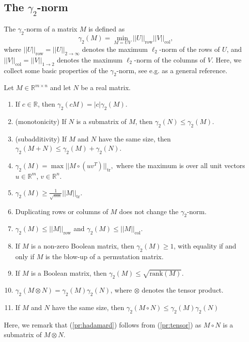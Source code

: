 \documentclass[11pt]{amsart}
\theoremstyle{plain}
\theoremstyle{definition}
\DeclareMathOperator{\tr}{tr}
\DeclareMathOperator{\row}{row}
\DeclareMathOperator{\col}{col}
\begin{document}
\subsection{The $\gamma_2$-norm}\label{sec:gamma2-properties}
The $\gamma_2$-norm of a matrix $M$ is defined as 
$$\gamma_2(M)=\min_{M=UV}||U||_{\row}||V||_{\col},$$
where $||U||_{\row}=||U||_{2\rightarrow\infty}$ denotes the maximum $\ell_2$-norm of the rows of $U$, and $||V||_{\col}=||V||_{1\rightarrow 2}$ denotes the maximum $\ell_2$-norm of the columns of $V$. 
Here, we collect some basic properties of the $\gamma_2$-norm, see e.g. \cite{LSS} as a general reference.

Let $M\in \mathbb{R}^{m\times n}$ and let $N$ be a real matrix.
\begin{enumerate}
    \item If $c\in \mathbb{R}$, then $\gamma_2(cM)=|c|\gamma_2(M)$.
    \item (monotonicity) If $N$ is a submatrix of $M$, then $\gamma_2(N)\leq \gamma_2(M)$.
    \item (subadditivity) If $M$ and $N$ have the same size, then $\gamma_2(M+N)\leq \gamma_2(M)+\gamma_2(N)$.
    \item\label{pr:gamma}  $\gamma_2(M)=\max||M\circ (u v^T)||_{\tr},$ where the maximum is over all unit vectors $u\in \mathbb{R}^m$, $v\in \mathbb{R}^{n}$.
    \item  $\gamma_2(M)\geq \frac{1}{\sqrt{mn}}||M||_{\tr}.$
    \item Duplicating rows or columns of $M$ does not change the $\gamma_2$-norm.
    \item $\gamma_2(M)\leq ||M||_{\row}$ and $\gamma_2(M)\leq ||M||_{\col}$.
    \item If $M$ is a non-zero Boolean matrix, then $\gamma_2(M)\geq 1$, with equality if and only if $M$ is the blow-up of a permutation matrix.
    \item If $M$ is a Boolean matrix, then $\gamma_2(M)\leq \sqrt{\mbox{rank}(M)}$.
    \item\label{pr:tensor} $\gamma_2(M\otimes N)=\gamma_2(M)\gamma_2(N)$, where $\otimes$ denotes the tensor product.
    \item\label{pr:hadamard} If $M$ and $N$ have the same size, then $\gamma_2(M\circ N)\leq \gamma_2(M)\gamma_2(N)$
\end{enumerate}

Here, we remark that (\ref{pr:hadamard}) follows from (\ref{pr:tensor}) as $M\circ N$ is a submatrix of $M\otimes N$.
\end{document}

